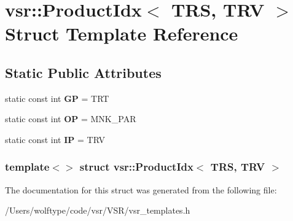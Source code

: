 \hypertarget{structvsr_1_1_product_idx_3_01_t_r_s_00_01_t_r_v_01_4}{\section{vsr\-:\-:Product\-Idx$<$ T\-R\-S, T\-R\-V $>$ Struct Template Reference}
\label{structvsr_1_1_product_idx_3_01_t_r_s_00_01_t_r_v_01_4}
}
\subsection*{Static Public Attributes}
\begin{DoxyCompactItemize}
\item 
\hypertarget{structvsr_1_1_product_idx_3_01_t_r_s_00_01_t_r_v_01_4_a39c3ff33670527e3a3a1d67ef80f721b}{static const int {\bfseries G\-P} = T\-R\-T}\label{structvsr_1_1_product_idx_3_01_t_r_s_00_01_t_r_v_01_4_a39c3ff33670527e3a3a1d67ef80f721b}

\item 
\hypertarget{structvsr_1_1_product_idx_3_01_t_r_s_00_01_t_r_v_01_4_a6d09152a3d575088595b491ae25673a4}{static const int {\bfseries O\-P} = M\-N\-K\-\_\-\-P\-A\-R}\label{structvsr_1_1_product_idx_3_01_t_r_s_00_01_t_r_v_01_4_a6d09152a3d575088595b491ae25673a4}

\item 
\hypertarget{structvsr_1_1_product_idx_3_01_t_r_s_00_01_t_r_v_01_4_a19d456251f19b78fc15970ac71ac46bf}{static const int {\bfseries I\-P} = T\-R\-V}\label{structvsr_1_1_product_idx_3_01_t_r_s_00_01_t_r_v_01_4_a19d456251f19b78fc15970ac71ac46bf}

\end{DoxyCompactItemize}
\subsubsection*{template$<$$>$ struct vsr\-::\-Product\-Idx$<$ T\-R\-S, T\-R\-V $>$}



The documentation for this struct was generated from the following file\-:\begin{DoxyCompactItemize}
\item 
/\-Users/wolftype/code/vsr/\-V\-S\-R/vsr\-\_\-templates.\-h\end{DoxyCompactItemize}
